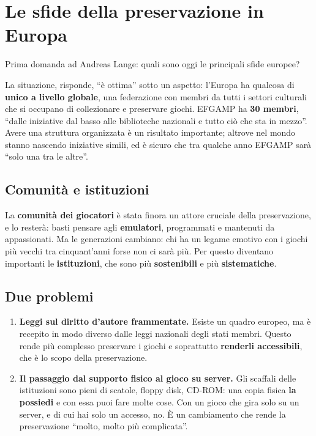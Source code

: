 \section{Le sfide della preservazione in Europa}
\label{sec:c1-4-sfide}

Prima domanda ad Andreas Lange: quali sono oggi le principali sfide europee?

La situazione, risponde, ``è ottima'' sotto un aspetto: l'Europa ha qualcosa di
\textbf{unico a livello globale}, una federazione con membri da tutti i settori
culturali che si occupano di collezionare e preservare giochi. EFGAMP ha
\textbf{30 membri}, ``dalle iniziative dal basso alle biblioteche nazionali e
tutto ciò che sta in mezzo''. Avere una struttura organizzata è un risultato
importante; altrove nel mondo stanno nascendo iniziative simili, ed è sicuro che
tra qualche anno EFGAMP sarà ``solo una tra le altre''.

\subsection{Comunità e istituzioni}

La \textbf{comunità dei giocatori} è stata finora un attore cruciale della
preservazione, e lo resterà: basti pensare agli \textbf{emulatori}, programmati e
mantenuti da appassionati. Ma le generazioni cambiano: chi ha un legame emotivo
con i giochi più vecchi tra cinquant'anni forse non ci sarà più. Per questo
diventano importanti le \textbf{istituzioni}, che sono più \textbf{sostenibili}
e più \textbf{sistematiche}.

\subsection{Due problemi}

\begin{enumerate}
  \item \textbf{Leggi sul diritto d'autore frammentate.} Esiste un quadro
        europeo, ma è recepito in modo diverso dalle leggi nazionali degli stati
        membri. Questo rende più complesso preservare i giochi e soprattutto
        \textbf{renderli accessibili}, che è lo scopo della preservazione.
  \item \textbf{Il passaggio dal supporto fisico al gioco su server.} Gli
        scaffali delle istituzioni sono pieni di scatole, floppy disk, CD-ROM:
        una copia fisica \textbf{la possiedi} e con essa puoi fare molte cose.
        Con un gioco che gira solo su un server, e di cui hai solo un accesso,
        no. È un cambiamento che rende la preservazione ``molto, molto più
        complicata''.
\end{enumerate}

